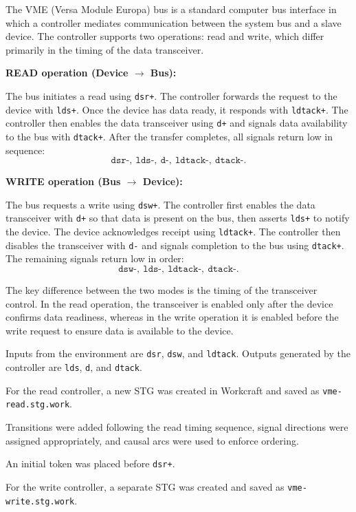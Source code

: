 \documentclass[a4paper,12pt]{article}
\begin{document}
The VME (Versa Module Europa) bus is a standard computer bus interface in which a controller mediates communication between the system bus and a slave device. The controller supports two operations: read and write, which differ primarily in the timing of the data transceiver.

\textbf{READ operation (Device $\rightarrow$ Bus):}

The bus initiates a read using \texttt{dsr+}. The controller forwards the request to the device with \texttt{lds+}. Once the device has data ready, it responds with \texttt{ldtack+}. The controller then enables the data transceiver using \texttt{d+} and signals data availability to the bus with \texttt{dtack+}. After the transfer completes, all signals return low in sequence:
\[
\texttt{dsr-},\ \texttt{lds-},\ \texttt{d-},\ \texttt{ldtack-},\ \texttt{dtack-}.
\]

\textbf{WRITE operation (Bus $\rightarrow$ Device):}

The bus requests a write using \texttt{dsw+}. The controller first enables the data transceiver with \texttt{d+} so that data is present on the bus, then asserts \texttt{lds+} to notify the device. The device acknowledges receipt using \texttt{ldtack+}. The controller then disables the transceiver with \texttt{d-} and signals completion to the bus using \texttt{dtack+}. The remaining signals return low in order:
\[
\texttt{dsw-},\ \texttt{lds-},\ \texttt{ldtack-},\ \texttt{dtack-}.
\]

The key difference between the two modes is the timing of the transceiver control. In the read operation, the transceiver is enabled only after the device confirms data readiness, whereas in the write operation it is enabled before the write request to ensure data is available to the device.

Inputs from the environment are \texttt{dsr}, \texttt{dsw}, and \texttt{ldtack}. Outputs generated by the controller are \texttt{lds}, \texttt{d}, and \texttt{dtack}.

For the read controller, a new STG was created in Workcraft and saved as \texttt{vme-read.stg.work}. 

Transitions were added following the read timing sequence, signal directions were assigned appropriately, and causal arcs were used to enforce ordering. 

An initial token was placed before \texttt{dsr+}.

For the write controller, a separate STG was created and saved as \texttt{vme-write.stg.work}. 
\end{document}
